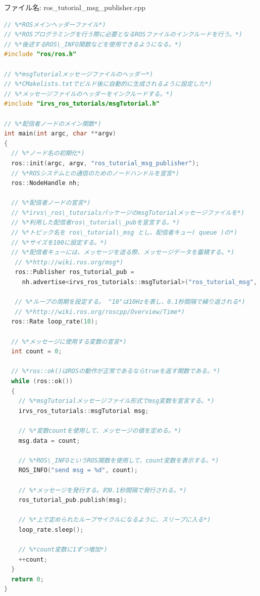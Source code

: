 ファイル名: ros\_tutorial\_msg\_publisher.cpp
\begin{lstlisting}[language=C++]
// %*ROSメインヘッダーファイル*)
// %*ROSプログラミングを行う際に必要となるROSファイルのインクルードを行う。*)
// %*後述するROS\_INFO関数などを使用できるようになる。*)
#include "ros/ros.h"

// %*msgTutorialメッセージファイルのヘッダー*)
// %*CMakelists.txtでビルド後に自動的に生成されるように設定した*)
// %*メッセージファイルのヘッダーをインクルードする。*)
#include "irvs_ros_tutorials/msgTutorial.h"

// %*配信者ノードのメイン関数*)
int main(int argc, char **argv)
{
  // %*ノード名の初期化*)
  ros::init(argc, argv, "ros_tutorial_msg_publisher");
  // %*ROSシステムとの通信のためのノードハンドルを宣言*)
  ros::NodeHandle nh;

  // %*配信者ノードの宣言*)
  // %*irvs\_ros\_tutorialsパッケージのmsgTutorialメッセージファイルを*)
  // %*利用した配信者ros\_tutorial\_pubを宣言する。*)
  // %*トピック名を ros\_tutorial\_msg とし、配信者キュー( queue )の*)
  // %*サイズを100に設定する。*)
  // %*配信者キューには、メッセージを送る際、メッセージデータを蓄積する。*)
   // %*http://wiki.ros.org/msg*)
   ros::Publisher ros_tutorial_pub =
     nh.advertise<irvs_ros_tutorials::msgTutorial>("ros_tutorial_msg", 100);

   // %*ループの周期を設定する。 "10"は10Hzを表し、0.1秒間隔で繰り返される*)
   // %*http://wiki.ros.org/roscpp/Overview/Time*)
  ros::Rate loop_rate(10);

  // %*メッセージに使用する変数の宣言*)
  int count = 0;

  // %*ros::ok()はROSの動作が正常であるならtrueを返す関数である。*)
  while (ros::ok())
  {
    // %*msgTutorialメッセージファイル形式でmsg変数を宣言する。*)
    irvs_ros_tutorials::msgTutorial msg;

    // %*変数countを使用して、メッセージの値を定める。*)
    msg.data = count;

    // %*ROS\_INFOというROS関数を使用して、count変数を表示する。*)
    ROS_INFO("send msg = %d", count);

    // %*メッセージを発行する。約0.1秒間隔で発行される。*)
    ros_tutorial_pub.publish(msg);

    // %*上で定められたループサイクルになるように、スリープに入る*)
    loop_rate.sleep();

    // %*count変数に1ずつ増加*)
    ++count;
  }
  return 0;
}
\end{lstlisting}

